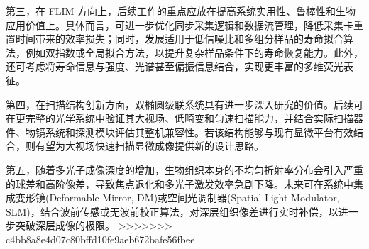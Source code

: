 第三，在 FLIM 方向上，后续工作的重点应放在提高系统实用性、鲁棒性和生物应用价值上。具体而言，可进一步优化同步采集逻辑和数据流管理，降低采集卡重置时间带来的效率损失；同时，发展适用于低信噪比和多组分样品的寿命拟合算法，例如双指数或全局拟合方法，以提升复杂样品条件下的寿命恢复能力。此外，还可考虑将寿命信息与强度、光谱甚至偏振信息结合，实现更丰富的多维荧光表征。

第四，在扫描结构创新方面，双椭圆级联系统具有进一步深入研究的价值。后续可在更完整的光学系统中验证其大视场、低畸变和匀速扫描能力，并结合实际扫描器件、物镜系统和探测模块评估其整机兼容性。若该结构能够与现有显微平台有效结合，则有望为大视场快速扫描显微成像提供新的设计思路。

第五，随着多光子成像深度的增加，生物组织本身的不均匀折射率分布会引入严重的球差和高阶像差，导致焦点退化和多光子激发效率急剧下降。未来可在系统中集成变形镜(Deformable Mirror, DM)或空间光调制器(Spatial Light Modulator, SLM)，结合波前传感或无波前校正算法，对深层组织像差进行实时补偿，以进一步突破深层成像的极限。
>>>>>>> c4bb8a8e4d07c80bffd10fe9aeb672bafe56fbee
